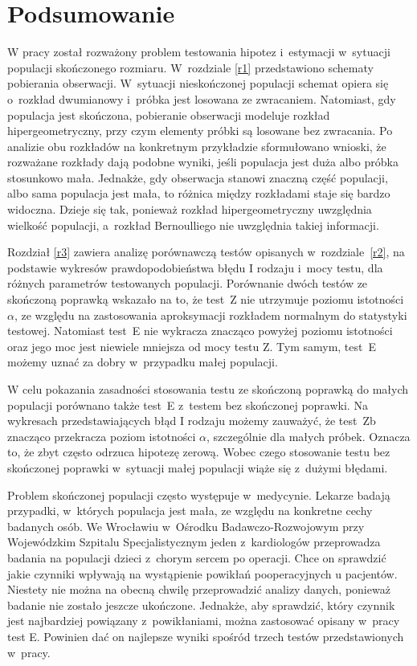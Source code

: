 \chapter*{Podsumowanie}

W pracy został rozważony problem testowania hipotez i~estymacji w~sytuacji populacji skończonego rozmiaru. W~rozdziale \ref{r1} przedstawiono schematy pobierania obserwacji. W~sytuacji nieskończonej populacji schemat opiera się o~rozkład dwumianowy i~próbka jest losowana ze zwracaniem. Natomiast, gdy populacja jest skończona, pobieranie obserwacji modeluje rozkład hipergeometryczny, przy czym elementy próbki są losowane bez zwracania. Po analizie obu rozkładów na konkretnym przykładzie sformułowano wnioski, że rozważane rozkłady dają podobne wyniki, jeśli populacja jest duża albo próbka stosunkowo mała. Jednakże, gdy obserwacja stanowi znaczną część populacji, albo sama populacja jest mała, to różnica między rozkładami staje się bardzo widoczna. Dzieje się tak, ponieważ rozkład hipergeometryczny uwzględnia wielkość populacji, a~rozkład Bernoulliego nie uwzględnia takiej informacji.

Rozdział \ref{r3} zawiera analizę porównawczą testów opisanych w~rozdziale~\ref{r2}, na podstawie wykresów prawdopodobieństwa błędu I rodzaju i~mocy testu, dla różnych parametrów testowanych populacji. Porównanie dwóch testów ze skończoną poprawką wskazało na to, że test~Z nie utrzymuje poziomu istotności $\alpha$, ze względu na zastosowania aproksymacji rozkładem normalnym do statystyki testowej. Natomiast test~E nie wykracza znacząco powyżej poziomu istotności oraz jego moc jest niewiele mniejsza od mocy testu Z. Tym samym, test~E możemy uznać za dobry w~przypadku małej populacji.

W celu pokazania zasadności stosowania testu ze skończoną poprawką do małych populacji porównano także test~E z~testem bez skończonej poprawki. Na wykresach przedstawiających błąd I rodzaju możemy zauważyć, że test~Zb znacząco przekracza poziom istotności $\alpha$, szczególnie dla małych próbek. Oznacza to, że zbyt często odrzuca hipotezę zerową. Wobec czego stosowanie testu bez skończonej poprawki w~sytuacji małej populacji wiąże się z~dużymi błędami.

Problem skończonej populacji często występuje w~medycynie. Lekarze badają przypadki, w~których populacja jest mała, ze względu na konkretne cechy badanych osób. We Wrocławiu w~Ośrodku Badawczo-Rozwojowym przy Wojewódzkim Szpitalu Specjalistycznym jeden z~kardiologów przeprowadza badania na populacji dzieci z~chorym sercem po operacji. Chce on sprawdzić jakie czynniki wpływają na wystąpienie powikłań pooperacyjnych u pacjentów. Niestety nie można na obecną chwilę przeprowadzić analizy danych, ponieważ badanie nie zostało jeszcze ukończone. Jednakże, aby sprawdzić, który czynnik jest najbardziej powiązany z~powikłaniami, można zastosować opisany w~pracy test E. Powinien dać on najlepsze wyniki spośród trzech testów przedstawionych w~pracy.